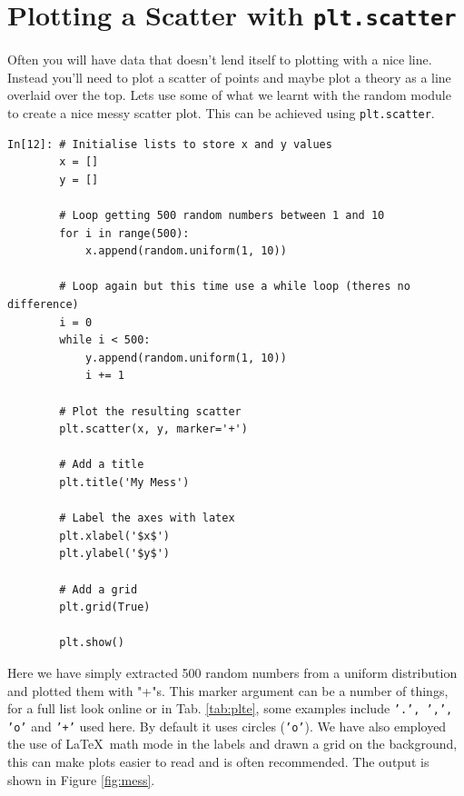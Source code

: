 \section{Plotting a Scatter with \texttt{plt.scatter}}

Often you will have data that doesn't lend itself to plotting with a nice line. Instead you'll need to plot a scatter of points and maybe plot a theory as a line overlaid over the top. Lets use some of what we learnt with the random module to create a nice messy scatter plot. This can be achieved using {\tt plt.scatter}.

\begin{lstlisting}[style=PY]
In[12]: # Initialise lists to store x and y values
        x = []
        y = []
        
        # Loop getting 500 random numbers between 1 and 10
        for i in range(500):
            x.append(random.uniform(1, 10))
        
        # Loop again but this time use a while loop (theres no difference)
        i = 0
        while i < 500:
            y.append(random.uniform(1, 10))
            i += 1
        
        # Plot the resulting scatter
        plt.scatter(x, y, marker='+')
        
        # Add a title
        plt.title('My Mess')
        
        # Label the axes with latex
        plt.xlabel('$x$')
        plt.ylabel('$y$')
        
        # Add a grid
        plt.grid(True)
        
        plt.show()
\end{lstlisting}

Here we have simply extracted 500 random numbers from a uniform distribution and plotted them with "+"s. This marker argument can be a number of things, for a full list look online or in Tab. \ref{tab:plte}, some examples include {\tt '.', ',', 'o'} and {\tt '+'} used here. By default it uses circles (\texttt{'o'}). We have also employed the use of \LaTeX\ math mode in the labels and drawn a grid on the background, this can make plots easier to read and is often recommended. The output is shown in Figure \ref{fig:mess}.

